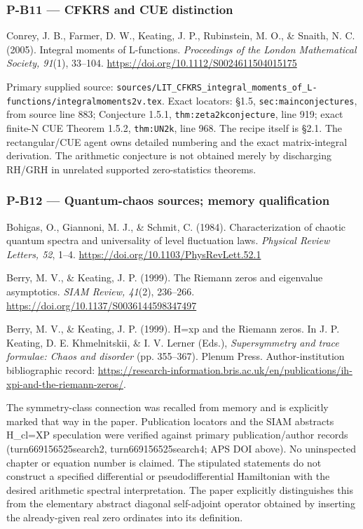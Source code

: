\documentclass[11pt,a4paper]{article}
\theoremstyle{definition}\newtheorem{definition}{Definition}
\begin{document}
\subsubsection{P-B11 --- CFKRS and CUE
distinction}\label{p-b11--cfkrs-and-cue-distinction}

Conrey, J. B., Farmer, D. W., Keating, J. P., Rubinstein, M. O., \&
Snaith, N. C. (2005). Integral moments of L-functions. \emph{Proceedings
of the London Mathematical Society, 91}(1), 33--104.
\url{https://doi.org/10.1112/S0024611504015175}

Primary supplied source:
\texttt{sources/LIT\_CFKRS\_integral\_moments\_of\_L-functions/integralmoments2v.tex}.
Exact locators: §1.5, \texttt{sec:mainconjectures}, from source line
883; Conjecture 1.5.1, \texttt{thm:zeta2kconjecture}, line 919; exact
finite-N CUE Theorem 1.5.2, \texttt{thm:UN2k}, line 968. The recipe
itself is §2.1. The rectangular/CUE agent owns detailed numbering and
the exact matrix-integral derivation. The arithmetic conjecture is not
obtained merely by discharging RH/GRH in unrelated supported
zero-statistics theorems.

\subsubsection{P-B12 --- Quantum-chaos sources; memory
qualification}\label{p-b12--quantum-chaos-sources-memory-qualification}

Bohigas, O., Giannoni, M. J., \& Schmit, C. (1984). Characterization of
chaotic quantum spectra and universality of level fluctuation laws.
\emph{Physical Review Letters, 52}, 1--4.
\url{https://doi.org/10.1103/PhysRevLett.52.1}

Berry, M. V., \& Keating, J. P. (1999). The Riemann zeros and eigenvalue
asymptotics. \emph{SIAM Review, 41}(2), 236--266.
\url{https://doi.org/10.1137/S0036144598347497}

Berry, M. V., \& Keating, J. P. (1999). H=xp and the Riemann zeros. In
J. P. Keating, D. E. Khmelnitskii, \& I. V. Lerner (Eds.),
\emph{Supersymmetry and trace formulae: Chaos and disorder} (pp.
355--367). Plenum Press. Author-institution bibliographic record:
\url{https://research-information.bris.ac.uk/en/publications/ih-xpi-and-the-riemann-zeros/}.

The symmetry-class connection was recalled from memory and is explicitly
marked that way in the paper. Publication locators and the SIAM
abstract\textquotesingle s H\_cl=XP speculation were verified against
primary publication/author records (turn669156525search2,
turn669156525search4; APS DOI above). No uninspected chapter or equation
number is claimed. The stipulated statements do not construct a
specified differential or pseudodifferential Hamiltonian with the
desired arithmetic spectral interpretation. The paper explicitly
distinguishes this from the elementary abstract diagonal self-adjoint
operator obtained by inserting the already-given real zero ordinates
into its definition.
\end{document}
